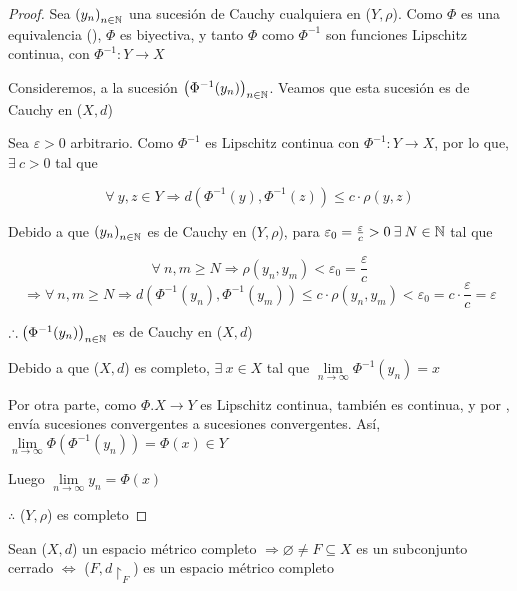 \begin{proof}
    Sea ${\left( y_n \right)}_{n \in \mathbb{N}}$ una sucesión de Cauchy cualquiera en ($Y,\rho$). Como $\Phi$ es una equivalencia (), $\Phi$ es biyectiva, y tanto $\Phi$ como ${\Phi}^{-1}$ son funciones Lipschitz continua, con ${\Phi}^{-1} : Y \to X$

    Consideremos, a la sucesión ${\left( {\Phi}^{-1} ( y_n) \right)}_{n \in \mathbb{N}}$. Veamos que esta sucesión es de Cauchy en ($X,d$)

    Sea $\varepsilon > 0$ arbitrario. Como ${\Phi}^{-1}$  es Lipschitz continua con ${\Phi}^{-1} : Y \to X$, por lo que, $\exists \: c > 0$ tal que

    $$\forall \: y, z \in Y \Rightarrow d({\Phi}^{-1} (y), {\Phi}^{-1} (z) ) \leqslant c \cdot \rho(y,z)$$

    Debido a que ${\left( y_n \right)}_{n \in \mathbb{N}}$ es de Cauchy en ($Y,\rho$), para $\varepsilon_0 = \frac{\varepsilon}{c} > 0 \: \exists \: N \in \mathbb{N}$ tal que

    $$\forall \: n, m \geqslant N \Rightarrow \rho(y_n, y_m) < \varepsilon_0 = \frac{\varepsilon}{c}$$
    $$\Rightarrow \forall \: n, m \geqslant N \Rightarrow d({\Phi}^{-1} (y_n), {\Phi}^{-1} (y_m)) \leqslant c \cdot \rho(y_n, y_m) < \varepsilon_0 = c \cdot \frac{\varepsilon}{c} = \varepsilon$$

    $\therefore {\left( {\Phi}^{-1} ( y_n) \right)}_{n \in \mathbb{N}}$ es de Cauchy en ($X,d$)

    Debido a que ($X,d$) es completo, $\exists \: x \in X$ tal que $\lim\limits_{n \to \infty} \Phi^{-1}(y_n) = x$

    Por otra parte, como $\Phi . X \to Y$ es Lipschitz continua, también es continua, y por , envía sucesiones convergentes a sucesiones convergentes. Así, $\lim\limits_{n \to \infty} \Phi {\left( {\Phi}^{-1} ( y_n) \right)} = \Phi(x) \in Y$

    Luego $\lim\limits_{n \to \infty} y_n = \Phi(x)$

    $\therefore$ ($Y,\rho$) es completo
\end{proof}

\begin{theorem} \label{theom427}
    Sean ($X,d$) un espacio métrico completo $\Rightarrow \varnothing \neq F \subseteq X$ es un subconjunto cerrado $\iff$ ($F, d \restriction_F$) es un espacio métrico completo
\end{theorem}

